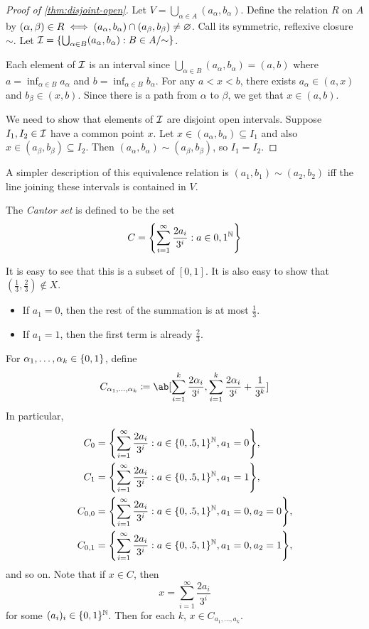 \begin{proof}[Proof of \cref{thm:disjoint-open}]
    Let $V = \bigcup_{\alpha \in A} (a_\alpha, b_\alpha)$.
    Define the relation $R$ on $A$ by $(\alpha, \beta) \in R
    \iff (a_\alpha, b_\alpha) \cap (a_\beta, b_\beta) \ne \varnothing$.
    Call its symmetric, reflexive closure $\sim$.
    Let $\mathcal{I} = \{\bigcup_{\alpha \in B} (a_\alpha, b_\alpha) : B \in A/{\sim}\}$.

    Each element of $\mathcal{I}$ is an interval since
    $\bigcup_{\alpha \in B} (a_\alpha, b_\alpha) = (a, b)$
    where $a = \inf_{\alpha \in B} a_\alpha$ and
    $b = \inf_{\alpha \in B} b_\alpha$.
    For any $a < x < b$, there exists $a_\alpha \in (a, x)$ and
    $b_\beta \in (x, b)$.
    Since there is a path from $\alpha$ to $\beta$, we get that
    $x \in (a, b)$.

    We need to show that elements of $\mathcal{I}$ are disjoint open intervals.
    Suppose $I_1, I_2 \in \mathcal{I}$ have a common point $x$.
    Let $x \in (a_\alpha, b_\alpha) \subseteq I_1$ and
    also $x \in (a_\beta, b_\beta) \subseteq I_2$.
    Then $(a_\alpha, b_\alpha) \sim (a_\beta, b_\beta)$, so $I_1 = I_2$.
\end{proof}
A simpler description of this equivalence relation is
$(a_1, b_1) \sim (a_2, b_2)$ iff the line joining these intervals is
contained in $V$.

\begin{definition*} \label{def:cantor-set}
    The \emph{Cantor set} is defined to be the set \[
        C = \set*{\sum_{i=1}^\infty \frac{2a_i}{3^i} : a \in {0, 1}^\N}
    \]
\end{definition*}
It is easy to see that this is a subset of $[0, 1]$.
It is also easy to show that $(\frac13, \frac23) \notin X$.
\begin{itemize}
    \item If $a_1 = 0$, then the rest of the summation is at most $\frac13$.
    \item If $a_1 = 1$, then the first term is already $\frac23$.
\end{itemize}
For $\alpha_1, \dots, \alpha_k \in \{0, 1\}$, define \[
    C_{\alpha_1, \dots, \alpha_k} \coloneq
        \ab[\sum_{i=1}^k \frac{2\alpha_i}{3^i},
            \sum_{i=1}^k \frac{2\alpha_i}{3^i} + \frac1{3^k}]
\]
In particular, \begin{align*}
    C_0 &= \set*{\sum_{i=1}^\infty \frac{2a_i}{3^i} : a \in \set{0, .5, 1}^\N, a_1 = 0}, \\
    C_1 &= \set*{\sum_{i=1}^\infty \frac{2a_i}{3^i} : a \in \set{0, .5, 1}^\N, a_1 = 1}, \\
    C_{0,0} &= \set*{\sum_{i=1}^\infty \frac{2a_i}{3^i} : a \in \set{0, .5, 1}^\N, a_1 = 0, a_2 = 0}, \\
    C_{0,1} &= \set*{\sum_{i=1}^\infty \frac{2a_i}{3^i} : a \in \set{0, .5, 1}^\N, a_1 = 0, a_2 = 1},
\end{align*} and so on.
Note that if $x \in C$, then \begin{equation} \label{eq:cantor-expansion}
    x = \sum_{i=1}^\infty \frac{2a_i}{3^i}
\end{equation}
for some $(a_i)_i \in \{0, 1\}^{\mathbb{N}}$.
Then for each $k$, $x \in C_{a_1, \dots, a_k}$.
